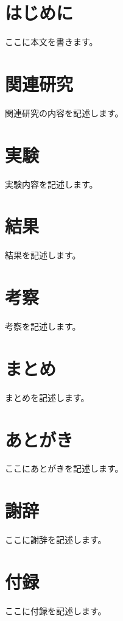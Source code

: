 \documentclass[a4paper,11pt]{jsarticle}
\begin{document}

\tableofcontents
\newpage
{} %

\section{はじめに}
ここに本文を書きます。

\section{関連研究}
関連研究の内容を記述します。

\section{実験}
実験内容を記述します。

\section{結果}
結果を記述します。

\section{考察}
考察を記述します。

\section{まとめ}
まとめを記述します。

\newpage




\newpage
\section*{あとがき}
ここにあとがきを記述します。

\newpage
\section*{謝辞}
ここに謝辞を記述します。

\newpage
\section*{付録}
ここに付録を記述します。
\end{document}
